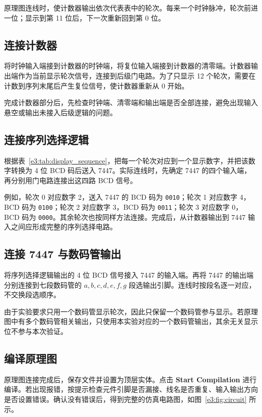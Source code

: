 \documentclass{ctexrep}
\begin{document}
原理图连线时，使计数器输出依次代表表中的轮次。每来一个时钟脉冲，轮次前进一位；显示到第 11 位后，下一次重新回到第 0 位。

\subsection{连接计数器}

将时钟输入端接到计数器的时钟端，将复位输入端接到计数器的清零端。计数器输出端作为当前显示轮次信号，连接到后级门电路。为了只显示 12 个轮次，需要在计数到序列末尾后产生复位信号，使计数器重新从 0 开始。

完成计数器部分后，先检查时钟端、清零端和输出端是否全部连接，避免出现输入悬空或输出未接入后级逻辑的问题。

\subsection{连接序列选择逻辑}

根据表~\ref{e3:tab:display_sequence}，把每一个轮次对应到一个显示数字，并把该数字转换为 4 位 BCD 码后送入 7447。实际连线时，先确定 7447 的四个输入端，再分别用门电路连接出这四路 BCD 信号。

例如，轮次 0 对应数字 2，送入 7447 的 BCD 码为 \texttt{0010}；轮次 1 对应数字 4，BCD 码为 \texttt{0100}；轮次 2 对应数字 3，BCD 码为 \texttt{0011}；轮次 3 对应数字 0，BCD 码为 \texttt{0000}。其余轮次也按同样方法连接。完成后，从计数器输出到 7447 输入之间应形成完整的序列选择电路。

\subsection{连接 7447 与数码管输出}

将序列选择逻辑输出的 4 位 BCD 信号接入 7447 的输入端。再将 7447 的输出端分别连接到七段数码管的 $a,b,c,d,e,f,g$ 段选输出引脚。连线时按段名逐一对应，不交换段选顺序。

由于实验要求只用一个数码管显示轮次，因此只保留一个数码管参与显示。若原理图中有多个数码管相关输出，只使用本实验对应的一个数码管输出，其余无关显示位不参与本次验证。

\subsection{编译原理图}

原理图连接完成后，保存文件并设置为顶层实体。点击 \textbf{Start Compilation} 进行编译。若出现报错，按提示检查元件引脚是否漏接、线名是否重复、输入输出方向是否设置错误。确认没有错误后，得到完整的仿真电路图，如图~\ref{e3:fig:circuit} 所示。
\end{document}
